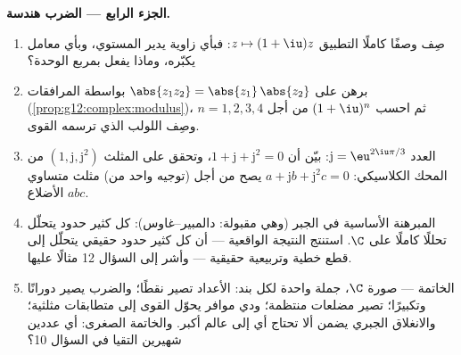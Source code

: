 \begin{problem}
\medskip
\noindent\textbf{الجزء الرابع --- الضرب هندسة.}
\begin{enumerate}[resume]
  \item صِف وصفًا كاملًا التطبيق $z \mapsto (1 + \iu)z$:
        فبأي زاوية يدير المستوي، وبأي معامل
        يكبّره، وماذا يفعل بمربع الوحدة؟
  \item برهن على $\abs{z_1 z_2} = \abs{z_1}\,\abs{z_2}$ بواسطة
        المرافقات (\cref{prop:g12:complex:modulus})، ثم
        احسب $(1+\iu)^n$ من أجل $n = 1, 2, 3, 4$ وصِف
        اللولب الذي ترسمه القوى.
  \item العدد $\mathrm{j} = \eu^{2\iu\pi/3}$: بيّن أن
        $1 + \mathrm{j} + \mathrm{j}^2 = 0$، وتحقق على المثلث
        $\left(1, \mathrm{j}, \mathrm{j}^2\right)$ من المحك الكلاسيكي:
        $a + \mathrm{j} b + \mathrm{j}^2 c = 0$ يصح من أجل (توجيه واحد من)
        مثلث متساوي الأضلاع $abc$.
  \item المبرهنة الأساسية في الجبر (وهي مقبولة:
        دالمبير--غاوس): كل كثير حدود يتحلّل تحللًا كاملًا
        على $\C$. استنتج النتيجة الواقعية --- أن كل
        كثير حدود حقيقي يتحلّل إلى قطع خطية وتربيعية حقيقية ---
        وأشر إلى السؤال 12 مثالًا عليها.
  \item الخاتمة --- صورة $\C$، جملة واحدة لكل بند: الأعداد
        تصير نقطًا؛ والضرب يصير
        دورانًا وتكبيرًا؛  تصير مضلعات
        منتظمة؛ ودي موافر يحوّل القوى إلى متطابقات
        مثلثية؛ والانغلاق الجبري يضمن ألا تحتاج أي
         إلى عالم أكبر. والخاتمة الصغرى: أي عددين
        شهيرين التقيا في السؤال 10؟
\end{enumerate}
\end{problem}
